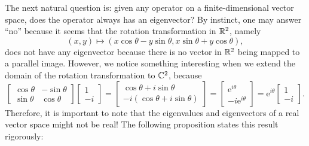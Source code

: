 \documentclass[math, code]{amznotes}
\theoremstyle{remark}
\begin{document}
The next natural question is: given any operator on a finite-dimensional vector space, does the operator always has an eigenvector? By instinct, one may answer ``no'' because it seems that the rotation transformation in $\mathbb{R}^2$, namely
\begin{equation*}
    (x, y) \mapsto (x\cos\theta - y\sin\theta, x\sin\theta + y\cos\theta),
\end{equation*}
does not have any eigenvector because there is no vector in $\mathbb{R}^2$ being mapped to a parallel image. However, we notice something interesting when we extend the domain of the rotation transformation to $\mathbb{C}^2$, because
\begin{equation*}
    \begin{bmatrix}
        \cos\theta & -\sin\theta \\
        \sin\theta & \cos\theta
    \end{bmatrix}\begin{bmatrix}
        1 \\
        -i
    \end{bmatrix} = \begin{bmatrix}
        \cos\theta + i\sin\theta \\
        -i(\cos\theta + i\sin\theta)
    \end{bmatrix} = \begin{bmatrix}
        \mathrm{e}^{i\theta} \\
        -i\mathrm{e}^{i\theta}
    \end{bmatrix} = \mathrm{e}^{i\theta}\begin{bmatrix}
        1 \\
        -i
    \end{bmatrix}.
\end{equation*}
Therefore, it is important to note that the eigenvalues and eigenvectors of a real vector space might not be real! The following proposition states this result rigorously:
\end{document}

